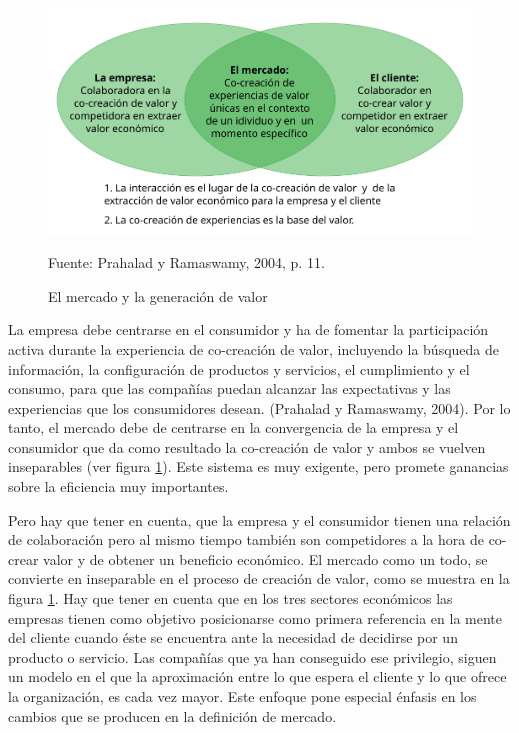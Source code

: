 \begin{figure}[!h]
	\caption{El mercado y la generación de valor}
	\centering \includegraphics[width=140mm]{capitulos/graficos/esferasPrahalad} 
	\label{fig:esferasPrahalad} 

	\footnotesize
		Fuente: Prahalad y Ramaswamy, 2004, p. 11.
\end{figure}

La empresa debe centrarse en el consumidor y ha de fomentar la participación activa durante la experiencia de co-creación de valor, incluyendo la búsqueda de información, la configuración de productos y servicios, el cumplimiento y el consumo, para que las compañías puedan alcanzar las expectativas y las experiencias que los consumidores desean. (Prahalad y Ramaswamy, 2004). Por lo tanto, el mercado debe de centrarse en la convergencia de la empresa y el consumidor que da como resultado la co-creación de valor y ambos se vuelven inseparables (ver figura \ref{fig:esferasPrahalad}). Este sistema es muy exigente, pero promete ganancias sobre la eficiencia muy importantes.

Pero hay que tener en cuenta, que la empresa y el consumidor tienen una relación de colaboración pero al mismo tiempo también son competidores a la hora de co-crear valor y de obtener un beneficio económico. El mercado como un todo, se convierte en inseparable en el proceso de creación de valor, como se muestra en la figura \ref{fig:esferasPrahalad}. Hay que tener en cuenta que en los tres sectores económicos las empresas tienen como objetivo posicionarse como primera referencia en la mente del cliente cuando éste se encuentra ante la necesidad de decidirse por un producto o servicio. Las compañías que ya han conseguido ese privilegio, siguen un modelo en el que la aproximación entre lo que espera el cliente y lo que ofrece la organización, es cada vez mayor. Este enfoque pone especial énfasis en los cambios que se producen en la definición de mercado.


